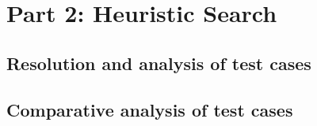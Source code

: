 
\section{Part 2: Heuristic Search}

\subsection{Resolution and analysis of test cases}

\paragraph{}

\subsection{Comparative analysis of test cases}

\paragraph{}
